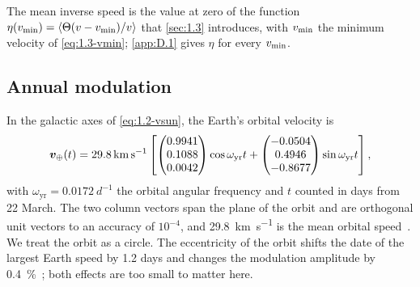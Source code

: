 The mean inverse speed is the value at zero of the function $\eta(v_{\mathrm{min}}) = \langle \Theta(v - v_{\mathrm{min}})/v\rangle$ that \cref{sec:1.3} introduces, with $v_{\mathrm{min}}$ the minimum velocity of \cref{eq:1.3-vmin}; \cref{app:D.1} gives $\eta$ for every $v_{\mathrm{min}}$.

\subsection{Annual modulation}

In the galactic axes of \cref{eq:1.2-vsun}, the Earth's orbital velocity is~\cite[Eq.~(11)]{baxter2021recommended}
\begin{equation}
  \bm{v}_{\oplus}(t) = \SI{29.8}{km.s^{-1}} \left[\begin{pmatrix} 0.9941\\ 0.1088\\ 0.0042 \end{pmatrix} \cos \omega_{\mathrm{yr}} t + \begin{pmatrix} -0.0504\\ 0.4946\\ -0.8677 \end{pmatrix} \sin \omega_{\mathrm{yr}} t \right],
  \label{eq:1.2-vorb}
\end{equation}
with $\omega_{\mathrm{yr}} = \SI{0.0172}{d^{-1}}$ the orbital angular frequency and $t$ counted in days from 22 March. The two column vectors span the plane of the orbit and are orthogonal unit vectors to an accuracy of $10^{-4}$, and \SI{29.8}{km.s^{-1}} is the mean orbital speed~\cite[Eq.~(13)]{baxter2021recommended}. We treat the orbit as a circle. The eccentricity of the orbit shifts the date of the largest Earth speed by 1.2 days and changes the modulation amplitude by \SI{0.4}{\percent}~\cite[Table~I]{mccabe2014earth}; both effects are too small to matter here.

